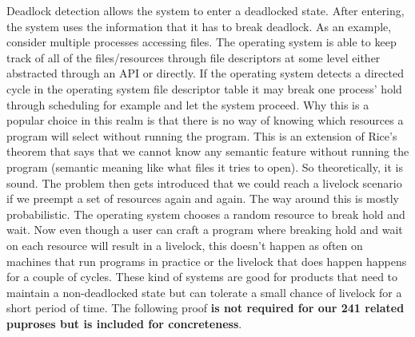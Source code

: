 Deadlock detection allows the system to enter a deadlocked state. After entering, the system uses the information that it has to break deadlock. As an example, consider multiple processes accessing files. The operating system is able to keep track of all of the files/resources through file descriptors at some level either abstracted through an API or directly. If the operating system detects a directed cycle in the operating system file descriptor table it may break one process' hold through scheduling for example and let the system proceed. Why this is a popular choice in this realm is that there is no way of knowing which resources a program will select without running the program. This is an extension of Rice's theorem \cite{rice} that says that we cannot know any semantic feature without running the program (semantic meaning like what files it tries to open). So theoretically, it is sound. The problem then gets introduced that we could reach a livelock scenario if we preempt a set of resources again and again. The way around this is mostly probabilistic. The operating system chooses a random resource to break hold and wait. Now even though a user can craft a program where breaking hold and wait on each resource will result in a livelock, this doesn't happen as often on machines that run programs in practice or the livelock that does happen happens for a couple of cycles. These kind of systems are good for products that need to maintain a non-deadlocked state but can tolerate a small chance of livelock for a short period of time. The following proof \textbf{is not required for our 241 related puproses but is included for concreteness}.

